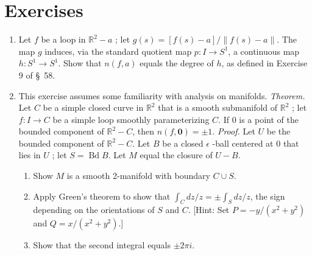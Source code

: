 \section*{Exercises}
\begin{enumerate}[itemsep=0.4em, parsep=0pt, topsep=0pt, partopsep=0pt, leftmargin=*, label=\arabic*., ref=\arabic*]
\item Let \(f\) be a loop in \(\mathbb{R}^{2} - a\) ; let \(g( s) = [ {f( s) - a}] /\parallel f( s) - a\parallel\). The map \(g\) induces, via the standard quotient map \(p : I \rightarrow {S}^{1}\), a continuous map \(h : S^{1} \rightarrow {S}^{1}\). Show that \(n( {f,a})\) equals the degree of \(h\), as defined in Exercise 9 of \S\ 58.
\item This exercise assumes some familiarity with analysis on manifolds. \textsl{Theorem.} Let \(C\) be a simple closed curve in \(\mathbb{R}^{2}\) that is a smooth submanifold of \(\mathbb{R}^{2}\) ; let \(f : I \rightarrow C\) be a simple loop smoothly parameterizing \(C\). If 0 is a point of the bounded component of \(\mathbb{R}^{2} - C\), then \(n( {f,\mathbf{0}}) = \pm 1\). \textsl{Proof.} Let \(U\) be the bounded component of \(\mathbb{R}^{2} - C\). Let \(B\) be a closed \(\epsilon\) -ball centered at 0 that lies in \(U\) ; let \(S = \operatorname{Bd}B\). Let \(M\) equal the closure of \(U - B\).
 \begin{enumerate}[itemsep=0.2em, parsep=0pt, topsep=0pt, partopsep=0pt, leftmargin=*, label=(\alph*), align=left]
 \item Show \(M\) is a smooth 2-manifold with boundary \(C \cup S\).
 \item Apply Green's theorem to show that \({\int }_{C}{dz}/z = \pm {\int }_{S}{dz}/z\), the sign depending on the orientations of \(S\) and \(C\). [Hint: Set \(P = - y/( {x^{2} + y^{2}})\) and \(Q = x/( {x^{2} + y^{2}})\).]
 \item Show that the second integral equals \(\pm {2\pi i}\).
 \end{enumerate}
\end{enumerate}